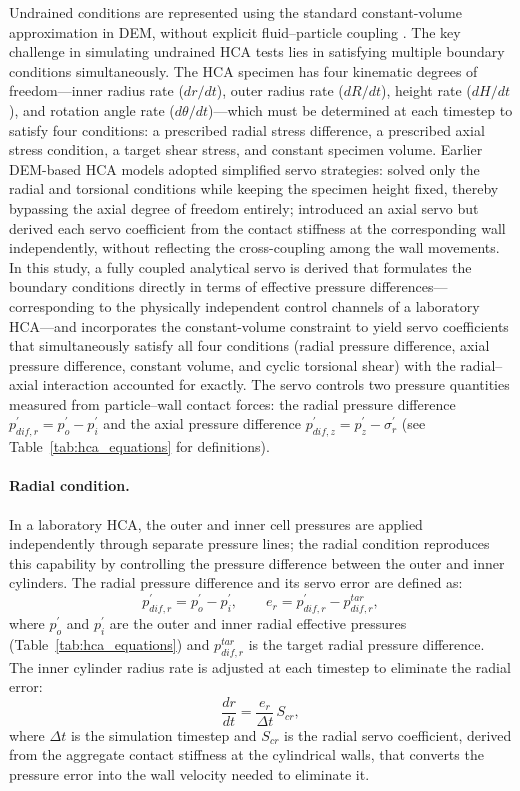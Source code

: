 \documentclass[a4paper,fleqn]{cas-sc}
\begin{document}
Undrained conditions are represented using the standard constant-volume approximation in DEM, without explicit fluid--particle coupling \citep{YimsiriSoga2010}. The key challenge in simulating undrained HCA tests lies in satisfying multiple boundary conditions simultaneously. The HCA specimen has four kinematic degrees of freedom---inner radius rate ($dr/dt$), outer radius rate ($dR/dt$), height rate ($dH/dt$), and rotation angle rate ($d\theta/dt$)---which must be determined at each timestep to satisfy four conditions: a prescribed radial stress difference, a prescribed axial stress condition, a target shear stress, and constant specimen volume. Earlier DEM-based HCA models adopted simplified servo strategies: \citet{Han2024jgs} solved only the radial and torsional conditions while keeping the specimen height fixed, thereby bypassing the axial degree of freedom entirely; \citet{Ma2024} introduced an axial servo but derived each servo coefficient from the contact stiffness at the corresponding wall independently, without reflecting the cross-coupling among the wall movements. In this study, a fully coupled analytical servo is derived that formulates the boundary conditions directly in terms of effective pressure differences---corresponding to the physically independent control channels of a laboratory HCA---and incorporates the constant-volume constraint to yield servo coefficients that simultaneously satisfy all four conditions (radial pressure difference, axial pressure difference, constant volume, and cyclic torsional shear) with the radial--axial interaction accounted for exactly. The servo controls two pressure quantities measured from particle--wall contact forces: the radial pressure difference $p_{dif,r}^{\prime}=p_o^{\prime}-p_i^{\prime}$ and the axial pressure difference $p_{dif,z}^{\prime}=p_z^{\prime}-\sigma_r^{\prime}$ (see Table~\ref{tab:hca_equations} for definitions). 
\paragraph{Radial condition.}
In a laboratory HCA, the outer and inner cell pressures are applied independently through separate pressure lines; the radial condition reproduces this capability by controlling the pressure difference between the outer and inner cylinders. The radial pressure difference and its servo error are defined as:
\begin{equation}
p_{dif,r}^{\prime} = p_o^{\prime} - p_i^{\prime}, \qquad e_r = p_{dif,r}^{\prime} - p_{dif,r}^{tar},
\label{eq:cond1_radial}
\end{equation}
where $p_o^{\prime}$ and $p_i^{\prime}$ are the outer and inner radial effective pressures (Table~\ref{tab:hca_equations}) and $p_{dif,r}^{tar}$ is the target radial pressure difference. The inner cylinder radius rate is adjusted at each timestep to eliminate the radial error:
\begin{equation}
\frac{dr}{dt} = \frac{e_r}{\Delta t}\,S_{cr},
\label{eq:servo_radial}
\end{equation}
where $\Delta t$ is the simulation timestep and $S_{cr}$ is the radial servo coefficient, derived from the aggregate contact stiffness at the cylindrical walls, that converts the pressure error into the wall velocity needed to eliminate it.
\end{document}
